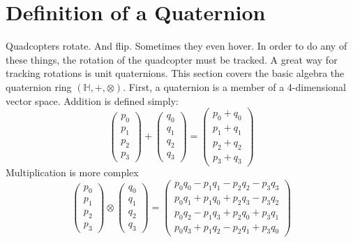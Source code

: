 \documentclass[lettersize,journal]{IEEEtran}
\begin{document}

\appendices
\section*{Definition of a Quaternion}
Quadcopters rotate. And flip. Sometimes they even hover. In order to do any of these things, the rotation of the quadcopter must be tracked. A great way for tracking rotations is unit quaternions. This section covers the basic algebra the quaternion ring $\left(\mathbb{H}, +, \otimes\right)$.
First, a quaternion is a member of a 4-dimensional vector space. Addition is defined simply:
\begin{equation}
  \begin{pmatrix}
    p_0 \\
    p_1 \\
    p_2 \\
    p_3
  \end{pmatrix} +
  \begin{pmatrix}
    q_0 \\
    q_1 \\
    q_2 \\
    q_3
  \end{pmatrix} =
  \begin{pmatrix}
    p_0 + q_0 \\
    p_1 + q_1 \\
    p_2 + q_2 \\
    p_3 + q_3
  \end{pmatrix}
\end{equation}
Multiplication is more complex
\begin{equation}
 \begin{pmatrix}
    p_0 \\
    p_1 \\
    p_2 \\
    p_3
  \end{pmatrix} \otimes 
  \begin{pmatrix}
    q_0 \\
    q_1 \\
    q_2 \\
    q_3
  \end{pmatrix} =
  \begin{pmatrix}
    p_0q_0 - p_1q_1 - p_2q_2 - p_3q_3 \\
    p_0q_1 + p_1q_0 + p_2q_3 - p_3q_2 \\
    p_0q_2 - p_1q_3 + p_2q_0 + p_3q_1 \\
    p_0q_3 + p_1q_2 - p_2q_1 + p_3q_0
  \end{pmatrix}
\end{equation}
\end{document}
